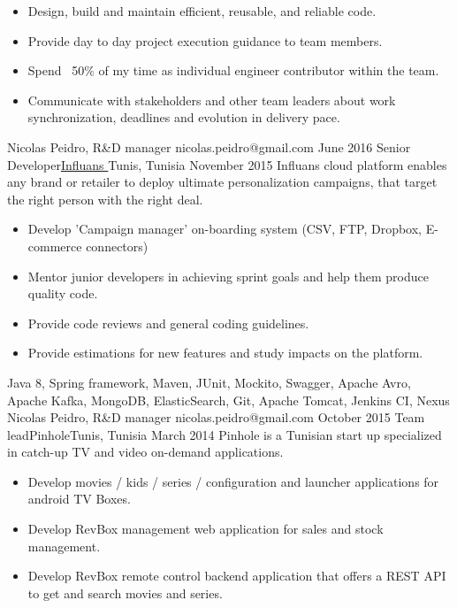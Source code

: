 \begin{experiences}
{\begin{itemize}
        \item Design, build and maintain efficient, reusable, and reliable code.
        \item Provide day to day project execution guidance to team members.
        \item Spend ~50\% of my time as individual engineer contributor within the team.
        \item Communicate with stakeholders and other team leaders about work synchronization, deadlines and evolution in delivery pace.
      \end{itemize}
    }
    {Nicolas Peidro, R\&D manager} {nicolas.peidro@gmail.com}
  \emptySeparator   
  \experienceWithReference
    {June 2016}       {Senior Developer}{\href{https://www.influans.com}{Influans \faExternalLink}}{Tunis, Tunisia}
    {November 2015}      {Influans cloud platform enables any brand or retailer to deploy ultimate personalization campaigns, that target the right person with the right deal.}
    {
      \begin{itemize}
        \item Develop 'Campaign manager' on-boarding system (CSV, FTP, Dropbox, E-commerce connectors)
        \item Mentor junior developers in achieving sprint goals and help them produce quality code.
        \item Provide code reviews and general coding guidelines.
        \item Provide estimations for new features and study impacts on the platform.
      \end{itemize}
    }
    {Java 8, Spring framework, Maven, JUnit, Mockito, Swagger, Apache Avro, Apache Kafka, MongoDB, ElasticSearch, Git, Apache Tomcat, Jenkins CI, Nexus}
    {Nicolas Peidro, R\&D manager} {nicolas.peidro@gmail.com}
  \emptySeparator  
  \experience
    {October 2015}   {Team lead}{Pinhole}{Tunis, Tunisia}
    {March 2014} {Pinhole is a Tunisian start up specialized in catch-up TV and video on-demand applications.}
                    {
                      \begin{itemize}
                        \item Develop movies / kids / series / configuration and launcher applications for android TV Boxes.
                        \item Develop RevBox management web application for sales and stock management.
                        \item Develop RevBox remote control backend application that offers a REST API to get and search movies and series.

\end{itemize}}
\end{experiences}
